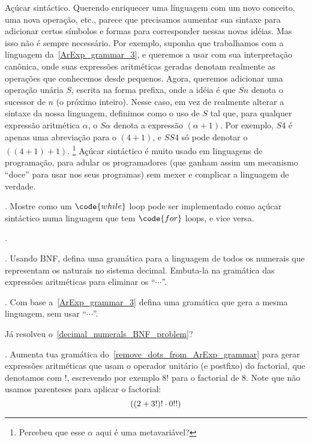 \note Açúcar sintáctico.
%
Querendo enriquecer uma linguagem com um novo conceito, uma nova operação,
etc., parece que precisamos aumentar sua sintaxe para adicionar certos
símbolos e formas para corresponder nessas novas idéias.
Mas isso não é sempre necessário.
Por exemplo, suponha que trabalhamos com a linguagem da~\ref{ArExp_grammar_3},
e queremos a usar com sua interpretação canônica, onde suas expressões aritméticas
geradas denotam realmente as operações que conhecemos desde pequenos.
Agora, queremos adicionar uma operação unária $S$, escrita na forma prefixa,
onde a idéia é que $Sn$ denota o sucessor de $n$ (o próximo inteiro).
Nesse caso, em vez de realmente alterar a sintaxe da nossa linguagem,
definimos como  o uso de $S$ tal que, para qualquer
expressão aritmética $\alpha$, o $S\alpha$ denota a expressão $(\alpha + 1)$.
Por exemplo, $S4$ é apenas uma abreviação para o $(4 + 1)$,
e $SS4$ só pode denotar o $((4 + 1) + 1)$.%
\footnote{Percebeu que esse $\alpha$ aqui é uma metavariável?}
Açúcar sintáctico é muito usado em linguagens de programação,
para adular os programadores (que ganham assim um mecanismo
``doce'' para usar nos seus programas) sem mexer e complicar
a linguagem de verdade.

\exercise.
\label{for_while_sugar}%
Mostre como um $\code{while}$ loop pode ser implementado como
açúcar sintáctico numa linguagem que tem $\code{for}$ loops,
e vice versa.

\endexercise

\endsection

\problems.

\problem.
\label{decimal_numerals_BNF_problem}%
Usando BNF, defina uma gramática para a linguagem de todos os
numerais que representam os naturais no sistema decimal.
Embuta-la na gramática das expressões aritméticas
para eliminar os ``$\dotsb$''.

\endproblem

\problem.
\label{remove_dots_from_ArExp_grammar}%
Com base a~\ref{ArExp_grammar_3} defina uma gramática que gera a mesma linguagem,
sem usar ``$\dotsb$''.

\hint
Já resolveu o~\ref{decimal_numerals_BNF_problem}?

\endproblem

\problem.
\label{ArExp_with_factorial}%
Aumenta tua gramática do~\ref{remove_dots_from_ArExp_grammar} para
gerar expressões aritméticas que usam o operador unitário (e postfixo)
do factorial, que denotamos com $!$, escrevendo por exemplo
$8!$ para o factorial de $8$.
Note que não usamos parenteses para aplicar o factorial:
$$
((2 + 3!)! \mathbin{\cdot} 0!!)
$$

